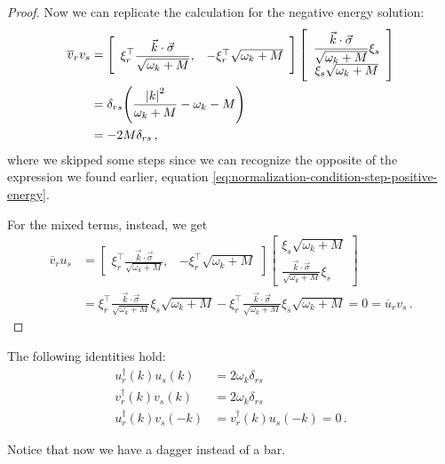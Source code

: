 \documentclass[main.tex]{subfiles}
\begin{document}
\begin{proof}
Now we can replicate the calculation for the negative energy solution: 
%
\begin{subequations}
\begin{align}
\overline{v}_{r} v_s &=
\left[\begin{array}{cc}
\displaystyle
\xi_{r}^{\top} \frac{\vec{k} \cdot \vec{\sigma}}{\sqrt{\omega_{k} + M}}, &
-\xi_{r}^{\top} \sqrt{\omega_{k} + M}
\end{array}\right]
\left[\begin{array}{c}
\displaystyle
\frac{\vec{k} \cdot \vec{\sigma}}{\sqrt{\omega_{k} + M}} \xi_{s}\\
\xi_{s}\sqrt{\omega_{k} + M} 
\end{array}\right]  \\
&= \delta_{rs} \qty( \frac{\abs{k}^2}{\omega_{k} + M}  - \omega_{k} - M) \\
&= -2M \delta_{rs}
\,,
\end{align}
\end{subequations}
%
where we skipped some steps since we can recognize the opposite of the expression we found earlier, equation \eqref{eq:normalization-condition-step-positive-energy}. 

For the mixed terms, instead, we get 
%
\begin{subequations}
\begin{align}
\overline{v}_{r} u_{s} &= 
\left[\begin{array}{cc}
\displaystyle
\xi_{r}^{\top} \frac{\vec{k} \cdot \vec{\sigma}}{\sqrt{\omega_{k} + M}}, &
-\xi_{r}^{\top} \sqrt{\omega_{k} + M}
\end{array}\right]
\left[\begin{array}{c}
\xi_{s}\sqrt{\omega_{k} + M} \\ 
\displaystyle
\frac{\vec{k} \cdot \vec{\sigma}}{\sqrt{\omega_{k} + M}} 
\xi_{s}
\end{array}\right]  \\
&= \xi_{r}^{\top} \frac{\vec{k} \cdot \vec{\sigma}}{\sqrt{\omega_{k} + M}}
\xi_{s} \sqrt{\omega_{k} +M} - 
\xi_{r}^{\top} \frac{\vec{k} \cdot \vec{\sigma}}{\sqrt{\omega_{k} + M}}
\xi_{s} \sqrt{\omega_{k} +M} = 0 = \overline{u}_{r} v_s
\label{eq:normalization-orthogonality-positive-negative-solutions}
\,.
\end{align}
\end{subequations}
\end{proof}

\begin{claim}
The following identities hold:
%
\begin{subequations}
\begin{align} 
u_{r}^\dag (k) u_{s}(k) &= 2 \omega_{k}\delta_{rs}  \\
v_{r}^\dag (k) v_{s}(k) &= 2 \omega_{k} \delta_{rs}  \\
u_{r}^\dag (k) v_{s}(-k) &=   
v_{r}^\dag (k) u_{s}(-k) = 0  
\,.
\end{align}
\end{subequations}

Notice that now we have a dagger instead of a bar.
\end{claim}
\end{document}
